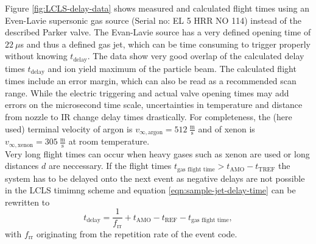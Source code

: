 Figure \ref{fig:LCLS-delay-data} shows measured and calculated flight times using an Even-Lavie supersonic gas source (Serial no: EL 5 HRR NO 114) instead of the described Parker valve. The Evan-Lavie source has a very defined opening time of $22~\mu$s and thus a defined gas jet, which can be time consuming to trigger properly without knowing $t_{\text{delay}}$. The data show very good overlap of the calculated delay times $t_{\text{delay}}$ and ion yield maximum of the particle beam. The calculated flight times include an error margin, which can also be read as a recommended scan range. While the electric triggering and actual valve opening times may add errors on the microsecond time scale, uncertainties in temperature and distance from nozzle to IR change delay times drastically. For completeness, the (here used) terminal velocity of argon is $v_{\infty,\text{argon}}=512~\frac{\text{m}}{\text{s}}$ and of xenon is $v_{\infty,\text{xenon}}=305~\frac{\text{m}}{\text{s}}$ at room temperature.\\
Very long flight times can occur when heavy gases such as xenon are used or long distances $d$ are neccessary. If the flight times $t_{\text{gas flight time}} > t_{\text{AMO}} - t_{\text{TREF}}$ the system has to be delayed onto the next event as negative delays are not possible in the LCLS timimng scheme and equation \eqref{eqn:sample-jet-delay-time} can be rewritten to
\begin{equation}
t_{\text{delay}} = \frac{1}{f_{\text{rr}}}+ t_{\text{AMO}} - t_{\text{REF}} - t_{\text{gas flight time}},
\label{eqn:sample-jet-delay-time-next}
\end{equation}
with $f_{\text{rr}}$ originating from the repetition rate of the event code.
%
%
%
